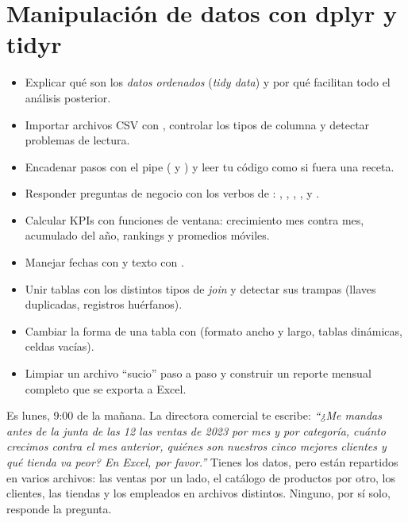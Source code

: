 \chapter{Manipulación de datos con dplyr y tidyr}
\label{cap:manipulacion}

\begin{objetivos}
\begin{itemize}
  \item Explicar qué son los \emph{datos ordenados} (\emph{tidy data}) y por
        qué facilitan todo el análisis posterior.
  \item Importar archivos CSV con , controlar los tipos de
        columna y detectar problemas de lectura.
  \item Encadenar pasos con el pipe (\codigo{\%>\%} y \codigo{|>}) y leer tu
        código como si fuera una receta.
  \item Responder preguntas de negocio con los verbos de :
        , , ,
        ,  y .
  \item Calcular KPIs con funciones de ventana: crecimiento mes contra mes,
        acumulado del año, rankings y promedios móviles.
  \item Manejar fechas con  y texto con .
  \item Unir tablas con los distintos tipos de \emph{join} y detectar sus
        trampas (llaves duplicadas, registros huérfanos).
  \item Cambiar la forma de una tabla con  (formato ancho y
        largo, tablas dinámicas, celdas vacías).
  \item Limpiar un archivo ``sucio'' paso a paso y construir un reporte
        mensual completo que se exporta a Excel.
\end{itemize}
\end{objetivos}

Es lunes, 9:00 de la mañana. La directora comercial te escribe: \emph{``¿Me
mandas antes de la junta de las 12 las ventas de 2023 por mes y por
categoría, cuánto crecimos contra el mes anterior, quiénes son nuestros cinco
mejores clientes y qué tienda va peor? En Excel, por favor.''} Tienes los
datos, pero están repartidos en varios archivos: las ventas por un lado, el
catálogo de productos por otro, los clientes, las tiendas y los empleados en
archivos distintos. Ninguno, por sí solo, responde la pregunta.

